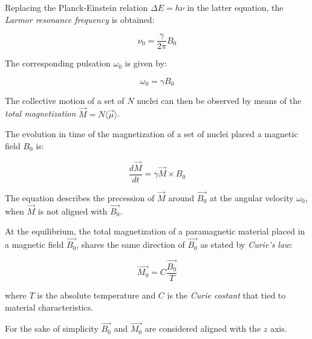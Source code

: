 \documentclass[12pt,openright,twoside,a4paper]{book}
\begin{document}
Replacing the Planck-Einstein relation $\Delta E=h \nu$ in the latter equation, the \textit{Larmor resonance frequency} is obtained:

\begin{equation}
\nu_0=\frac{\gamma}{2\pi}B_0
\end{equation}

The corresponding pulsation $\omega_0$ is given by:

\begin{equation}
\omega_0=\gamma B_0
\end{equation}
\vspace{5mm}

The collective motion of a set of $N$ nuclei can then be observed by means of the \textit{total magnetization} $\overrightarrow{M}=N\langle \overrightarrow{\mu}\rangle$.

The evolution in time of the magnetization  of a set of nuclei placed a magnetic  field $B_0$ is:

\begin{equation}
\frac{d\overrightarrow{M}}{dt}=\gamma \overrightarrow{M} \times B_0
\end{equation}

The equation describes the precession of $\overrightarrow{M}$ around $\overrightarrow{B_0}$ at the angular velocity $\omega_0$, when $\overrightarrow{M}$ is not aligned with $\overrightarrow{B_0}$.

At the equilibrium, the total magnetization of a paramagnetic material placed in a magnetic field $\overrightarrow{B_0}$, shares the same direction of $\overrightarrow{B_0}$ as stated by \textit{Curie's law}:

\begin{equation}
\overrightarrow{M_0}=C\frac{\overrightarrow{B_0}}{T}
\end{equation}

where $T$ is the absolute temperature and $C$ is the \textit{Curie costant} that tied to material characteristics.

For the sake of simplicity $\overrightarrow{B_0}$ and $\overrightarrow{M_0}$ are considered aligned with the $z$ axis.
\vspace{5mm}
\end{document}
